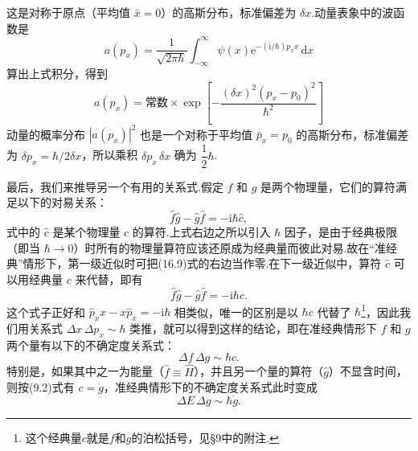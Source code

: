 这是对称于原点（平均值 $\bar{x}=0$）的高斯分布，标准偏差为 $\delta x$.动量表象中的波函数是
\begin{equation*}
  a(p_x)=\frac{1}{\sqrt{2\pi\hbar}}
  \int_{-\infty}^{\infty}\psi(x)\mathrm{e}^{-(\mathrm{i}/\hbar)p_xx}\,\mathrm{d}x
\end{equation*}
算出上式积分，得到
\begin{equation*}
  a(p_x)=\text{常数}\times
  \exp\left[-\frac{(\delta x)^{2}(p_x-p_0)^{2}}{\hbar^{2}}\right]
\end{equation*}
动量的概率分布 $|a(p_x)|^{2}$ 也是一个对称于平均值 $\bar{p}_x=p_0$ 的高斯分布，标准偏差为 $\delta p_x=\hbar/2\delta x$，所以乘积 $\delta p_x\,\delta x$ 确为 $\dfrac{1}{2}\hbar$.

最后，我们来推导另一个有用的关系式.假定 $f$ 和 $g$ 是两个物理量，它们的算符满足以下的对易关系：
\begin{equation}
  \hat{f}\hat{g}-\hat{g}\hat{f}=-\mathrm{i}\hbar\hat{c},
\end{equation}
式中的 $\hat{c}$ 是某个物理量 $c$ 的算符.上式右边之所以引入 $\hbar$ 因子，是由于经典极限（即当 $\hbar\to0$）时所有的物理量算符应该还原成为经典量而彼此对易.故在“准经典”情形下，第一级近似时可把(16.9)式的右边当作零.在下一级近似中，算符 $\hat{c}$ 可以用经典量 $c$ 来代替，即有
\begin{equation*}
  \hat{f}\hat{g}-\hat{g}\hat{f}=-\mathrm{i}\hbar c.
\end{equation*}
这个式子正好和 $\hat{p}_xx-x\hat{p}_x=-\mathrm{i}\hbar$ 相类似，唯一的区别是以 $\hbar c$ 代替了 $\hbar$\footnote{这个经典量$c$就是$f$和$g$的泊松括号，见§9中的附注.}，因此我们用关系式 $\Delta x\,\Delta p_x\sim\hbar$ 类推，就可以得到这样的结论，即在准经典情形下 $f$ 和 $g$ 两个量有以下的不确定度关系式：
\begin{equation}
  \Delta f\,\Delta g\sim\hbar c.
\end{equation}
特别是，如果其中之一为能量（$\hat{f}\equiv\hat{H}$），并且另一个量的算符（$\hat{g}$）不显含时间，则按(9.2)式有 $c=\dot{g}$，准经典情形下的不确定度关系式此时变成
\begin{equation}
  \Delta E\,\Delta g\sim\hbar\dot{g}.
\end{equation}
